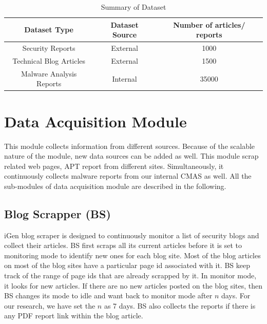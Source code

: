 \begin{table}[tb]
\caption{Summary of Dataset} %
\centering %
\begin{tabular}{c c c} %
\hline\hline %
Dataset Type & Dataset Source & Number of articles/ reports \\ [0.5ex] %
\hline %
Security Reports & External & 1000 \\ %
Technical Blog Articles & External & 1500 \\
Malware Analysis Reports & Internal & 35000 \\[1ex] %
\hline %
\end{tabular}
\label{table:dataset} %
\end{table}

\section{Data Acquisition Module}
This module collects information from different sources. Because of the scalable nature of the module, new data sources can be added as well. This module scrap related web pages, APT report from different sites. Simultaneously, it continuously collects malware reports from our internal CMAS as well. All the sub-modules of data acquisition module are described in the following.

\subsection{Blog Scrapper (BS)}
iGen blog scraper is designed to continuously monitor a list of security blogs and collect their articles. BS first scraps all its current articles before it is set to monitoring mode to identify new ones for each blog site. Most of the blog articles on most of the blog sites have a particular page id associated with it. BS keep track of the range of page ids that are already scrapped by it. In monitor mode, it looks for new articles. If there are no new articles posted on the blog sites, then BS changes its mode to idle and want back to monitor mode after $n$ days. For our research, we have set the $n$ as 7 days. BS also collects the reports if there is any PDF report link within the blog article.



